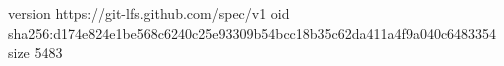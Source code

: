 version https://git-lfs.github.com/spec/v1
oid sha256:d174e824e1be568c6240c25e93309b54bcc18b35c62da411a4f9a040c6483354
size 5483
